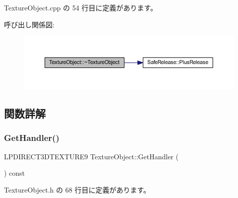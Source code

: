  Texture\+Object.\+cpp の 54 行目に定義があります。

呼び出し関係図\+:\nopagebreak
\begin{figure}[H]
\begin{center}
\leavevmode
\includegraphics[width=350pt]{class_texture_object_aeed25fa5ca8e892b96145f4a649e090a_cgraph}
\end{center}
\end{figure}


\subsection{関数詳解}
\mbox{\label{class_texture_object_a1b6c93f36e03686f7198b93355c73c8a}} 
\subsubsection{\texorpdfstring{Get\+Handler()}{GetHandler()}}
{\footnotesize\ttfamily L\+P\+D\+I\+R\+E\+C\+T3\+D\+T\+E\+X\+T\+U\+R\+E9 Texture\+Object\+::\+Get\+Handler (\begin{DoxyParamCaption}{ }\end{DoxyParamCaption}) const\hspace{0.3cm}{\ttfamily [inline]}}



 Texture\+Object.\+h の 68 行目に定義があります。

